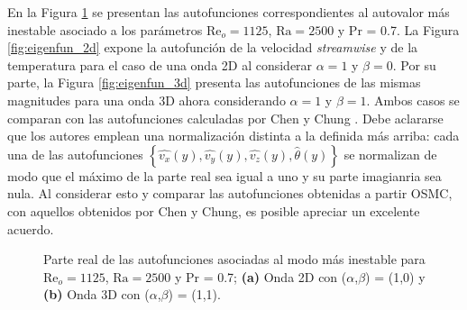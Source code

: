 En la Figura \ref{fig:eigenfun_valid} se presentan las autofunciones correspondientes al autovalor más inestable asociado a los parámetros $\text{Re}_o=1125$, $\text{Ra}=2500$ y Pr = 0.7. La Figura \ref{fig:eigenfun_2d} expone la autofunción de la velocidad \textit{streamwise} y de la temperatura para el caso de una onda 2D al considerar $\alpha=1$ y $\beta=0$. Por su parte, la Figura \ref{fig:eigenfun_3d} presenta las autofunciones de las mismas magnitudes para una onda 3D ahora considerando $\alpha=1$ y $\beta=1$. Ambos casos se comparan con las autofunciones calculadas por Chen y Chung \cite{chen2003direct}. Debe aclararse que los autores emplean una normalización distinta a la definida más arriba: cada una de las autofunciones $\left\lbrace \widehat{v_x}(y), \widehat{v_y}(y), \widehat{v_z}(y), \widehat{\theta}(y) \right\rbrace$ se normalizan de modo que el máximo de la parte real sea igual a uno y su parte imagianria sea nula. Al considerar esto y comparar las autofunciones obtenidas a partir OSMC, con aquellos obtenidos por Chen y Chung, es posible apreciar un excelente acuerdo.

\begin{figure}[H]
 \centering
 	\caption{Parte real de las autofunciones asociadas al modo más inestable para $\text{Re}_o=1125$, $\text{Ra}=2500$ y Pr = 0.7; \textbf{(a)} Onda 2D con ($\alpha$,$\beta$) = (1,0) y \textbf{(b)} Onda 3D con ($\alpha$,$\beta$) = (1,1).} 
 \label{fig:eigenfun_valid}
\end{figure}

